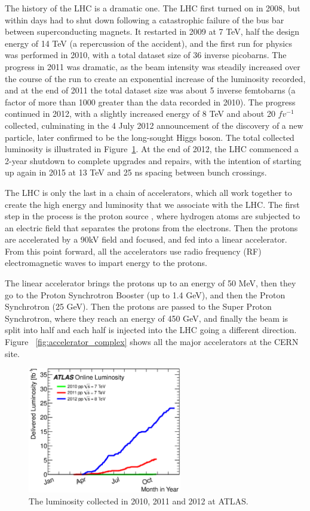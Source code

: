 The history of the LHC is a dramatic one.  The LHC first turned on in 2008, but within 
days had to shut down following a catastrophic failure of the bus bar between superconducting magnets.  It restarted in 
2009 at 7 TeV, half the design energy of 14 TeV (a repercussion of the accident), and 
the first run for physics was performed in 2010, with a total dataset size of 36 inverse picobarns.  
The progress in 2011 was dramatic, as the beam intensity was steadily increased over the course of the run 
to create an exponential increase of the luminosity recorded, and at the end of 2011 the total dataset size 
was about 5 inverse femtobarns (a factor of more than 1000 greater than the data recorded in 2010).  
The progress continued in 2012, with a slightly increased energy of 8 TeV and about 20 $fv^{-1}$ 
collected, culminating in the 4 July 2012 announcement of the discovery of a new particle, later confirmed to 
be the long-sought Higgs boson.  The total collected luminosity is illustrated in Figure~\ref{fig:lumi_vs_year}.  
At the end of 2012, the LHC commenced a 2-year shutdown to complete upgrades and repairs, 
with the intention of starting up again in 2015 at 13 TeV and 25 ns spacing between bunch crossings.


The LHC is only the last in a chain of accelerators, which all work together to create the high 
energy and luminosity that we associate with the LHC.  The first step in the process is the proton source
, where hydrogen atoms are subjected to an electric field that separates the protons from the electrons.  Then the 
protons are accelerated by a 90kV field and focused, and fed into a linear accelerator.  From this point 
forward, all the accelerators use radio frequency (RF) electromagnetic waves to impart energy to the protons.  

The linear accelerator brings the protons up to an energy of 50 MeV, then they go to the Proton 
Synchrotron Booster (up to 1.4 GeV), and then the Proton Synchrotron (25 GeV).  Then 
the protons are passed to the Super Proton Synchrotron, where they reach an energy of 450 GeV, and 
finally the beam is split into half and each half is injected into the LHC going a different direction.  
Figure ~\ref{fig:accelerator_complex} shows all the major accelerators at the CERN site.


\begin{figure}
	\centering
	\includegraphics[width=0.6\textwidth]{ATLASDetector/images/intlumivsyear.eps}
	\caption{The luminosity collected in 2010, 2011 and 2012 at ATLAS. \label{fig:lumi_vs_year}}
\end{figure}


